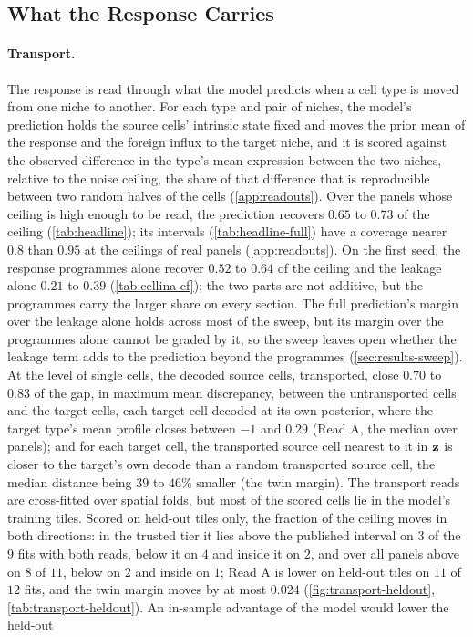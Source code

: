 \subsection{What the Response Carries}
\label{sec:results-w}

\paragraph{Transport.}
  The response is read through what the model predicts when a cell type is moved from one niche to another. For each type and pair of niches, the model's prediction holds the source cells' intrinsic state fixed and moves the prior mean of the response and the foreign influx to the target niche, and it is scored against the observed difference in the type's mean expression between the two niches, relative to the noise ceiling, the share of that difference that is reproducible between two random halves of the cells (\cref{app:readouts}). Over the panels whose ceiling is high enough to be read, the prediction recovers $0.65$ to $0.73$ of the ceiling (\cref{tab:headline}); its intervals (\cref{tab:headline-full}) have a coverage nearer $0.8$ than $0.95$ at the ceilings of real panels (\cref{app:readouts}). On the first seed, the response programmes alone recover $0.52$ to $0.64$ of the ceiling and the leakage alone $0.21$ to $0.39$ (\cref{tab:cellina-cf}); the two parts are not additive, but the programmes carry the larger share on every section. The full prediction's margin over the leakage alone holds across most of the sweep, but its margin over the programmes alone cannot be graded by it, so the sweep leaves open whether the leakage term adds to the prediction beyond the programmes (\cref{sec:results-sweep}). At the level of single cells, the decoded source cells, transported, close $0.70$ to $0.83$ of the gap, in maximum mean discrepancy, between the untransported cells and the target cells, each target cell decoded at its own posterior, where the target type's mean profile closes between $-1$ and $0.29$ (Read A, the median over panels); and for each target cell, the transported source cell nearest to it in $\mathbf{z}$ is closer to the target's own decode than a random transported source cell, the median distance being $39$ to $46\%$ smaller (the twin margin). The transport reads are cross-fitted over spatial folds, but most of the scored cells lie in the model's training tiles. Scored on held-out tiles only, the fraction of the ceiling moves in both directions: in the trusted tier it lies above the published interval on $3$ of the $9$ fits with both reads, below it on $4$ and inside it on $2$, and over all panels above on $8$ of $11$, below on $2$ and inside on $1$; Read A is lower on held-out tiles on $11$ of $12$ fits, and the twin margin moves by at most $0.024$ (\cref{fig:transport-heldout}, \cref{tab:transport-heldout}). An in-sample advantage of the model would lower the held-out 